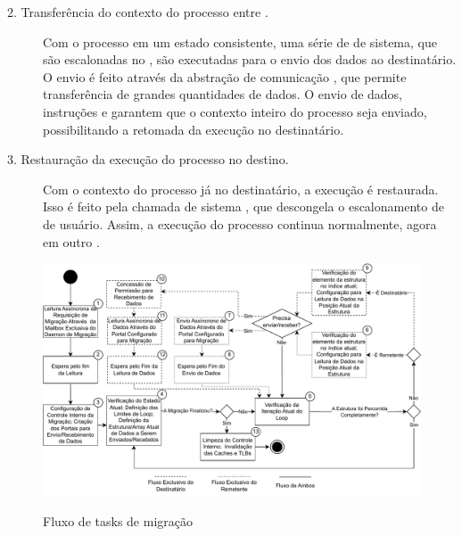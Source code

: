 \begin{description}
	\item[2. Transferência do contexto do processo entre \clusters.] \hfill
    
    Com o processo em um estado consistente, uma série de \tasks de sistema, que são escalonadas no \mcore, são executadas para o envio dos dados ao \cluster destinatário. O envio é feito através da abstração de comunicação \portal, que permite transferência de grandes quantidades de dados. O envio de dados, instruções e \uarea garantem que o contexto inteiro do processo seja enviado, possibilitando a retomada da execução no \cluster destinatário.
    
    \item[3. Restauração da execução do processo no \cluster destino.] \hfill
	
    Com o contexto do processo já no \cluster destinatário, a execução é restaurada. Isso é feito pela chamada de sistema \unfreeze, que descongela o escalonamento de \threads de usuário. Assim, a execução do processo continua normalmente, agora em outro \cluster.
\end{description}

\begin{figure}[b]
    \centering
    \caption{Fluxo de tasks de migração}
    \includegraphics[width=\linewidth]{content/images/migration-steps-tasks.pdf}
    \label{fig.migrationsteps}
\end{figure}

